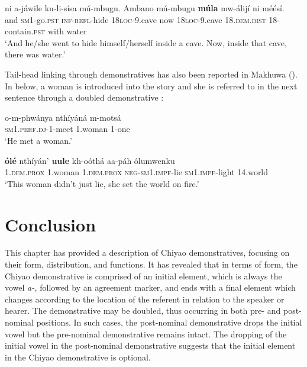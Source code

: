 \documentclass[output=paper,
            colorlinks, citecolor=brown
            ,draftmode
		  ]{langscibook}
\begin{document}
\ea%
    \label{ex:taji:39}
    \gll ni          a-jáwile            ku-li-sísa                mú-mbugu. Ambano    mú-mbugu            \textbf{múla}                      mw-álijí                ni       méésí.\\
  and      \textsc{sm1}-go.\textsc{pst}    \textsc{inf-refl}-hide    \textsc{18loc}-9.cave now          \textsc{18loc}-9.cave      18.\textsc{dem.dist}      18-contain.\textsc{pst}    with    water\\
    \glt ‘And he/she went to hide himself/herself inside a cave. Now, inside that cave, there was   water.’
\z

Tail-head linking through demonstratives has also been reported in Makhuwa (\citealt[201]{vanderWal2010}). In  below, a woman is introduced into the story and she is referred to in the next sentence through a doubled demonstrative :

\ea%
    \label{ex:taji:40}
    \ea\label{ex:taji:40a}\gll o-m-phwánya                  nthíyáná      m-motsá\\
      \textsc{sm1.perf.dj}-1-meet    1.woman    1-one\\
    \glt ‘He met a woman.’

    \ex\label{ex:taji:40b}\gll  \textbf{ólé}                        nthíyán’      \textbf{uule}                      kh-oóthá      aa-páh                      ólumwenku\\
      1.\textsc{dem.prox}    1.woman    1.\textsc{dem.prox}      \textsc{neg-sm1.impf}-lie \textsc{sm1.impf}-light    14.world\\
    \glt ‘This woman didn’t just lie, she set the world on fire.’
    \z
\z

\section{Conclusion}\label{sec:taji:7}


This chapter has provided a description of Chiyao demonstratives, focusing on their form, distribution, and functions. It has revealed that in terms of form, the Chiyao demonstrative is comprised of an initial element, which is always the vowel \textit{a-,} followed by an agreement marker, and ends with a final element which changes according to the location of the referent in relation to the speaker or hearer. The demonstrative may be doubled, thus occurring in both pre- and post-nominal positions. In such cases, the post-nominal demonstrative drops the initial vowel but the pre-nominal demonstrative remains intact. The dropping of the initial vowel in the post-nominal demonstrative suggests that the initial element in the Chiyao demonstrative is optional. 
\end{document}
